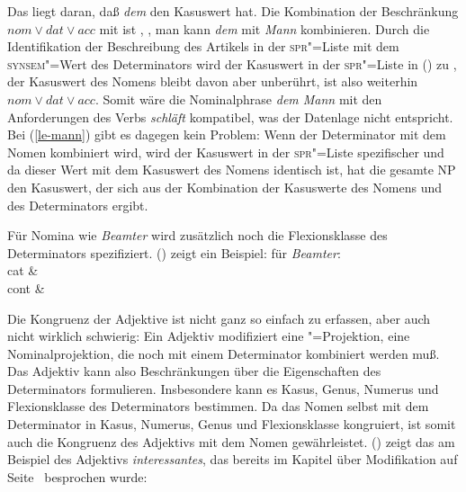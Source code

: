 \z
{}
\z
Das liegt daran, daß \emph{dem} den Kasuswert  hat. Die Kombination der Beschränkung
$nom \vee dat \vee acc$ mit  ist , \dash, man kann \emph{dem}
mit \emph{Mann} kombinieren. Durch die Identifikation der Beschreibung des Artikels
in der \textsc{spr}"=Liste mit dem \textsc{synsem}"=Wert des Determinators wird der Kasuswert
in der \textsc{spr}"=Liste in () zu , der Kasuswert des Nomens bleibt
davon aber unberührt, ist also weiterhin $nom \vee dat \vee acc$. Somit wäre die Nominalphrase
\emph{dem Mann} mit den Anforderungen des Verbs \emph{schläft} kompatibel, was der
Datenlage nicht entspricht.
Bei (\ref{le-mann}) gibt es dagegen kein Problem: Wenn der Determinator mit dem Nomen
kombiniert wird, wird der Kasuswert in der \textsc{spr}"=Liste spezifischer und da dieser
Wert mit dem Kasuswert des Nomens identisch ist, hat die gesamte NP den Kasuswert, der
sich aus der Kombination der Kasuswerte des Nomens und des Determinators ergibt.


Für Nomina wie \emph{Beamter} wird zusätzlich noch die Flexionsklasse des Determinators
spezifiziert. () zeigt ein Beispiel:
\ea
\label{le-beamter}
\localw für \emph{Beamter}:\\
\ms
{ cat &  \\
  cont &  \\
}
\z

\noindent
Die Kongruenz der Adjektive ist nicht ganz so einfach zu erfassen, aber auch nicht wirklich schwierig:
Ein Adjektiv modifiziert eine \nbar"=Projektion, \dash eine Nominalprojektion, die noch mit einem Determinator
kombiniert werden muß. Das Adjektiv kann also Beschränkungen über die Eigenschaften des Determinators
formulieren. Insbesondere kann es Kasus, Genus, Numerus und Flexionsklasse des Determinators bestimmen.
Da das Nomen selbst mit dem Determinator in Kasus, Numerus, Genus und Flexionsklasse kongruiert, ist somit
auch die Kongruenz des Adjektivs mit dem Nomen gewährleistet. () zeigt das am Beispiel
des Adjektivs \emph{interessantes}, das bereits im Kapitel über Modifikation auf Seite~\pageref{le-interessantes-sem}
besprochen wurde:

